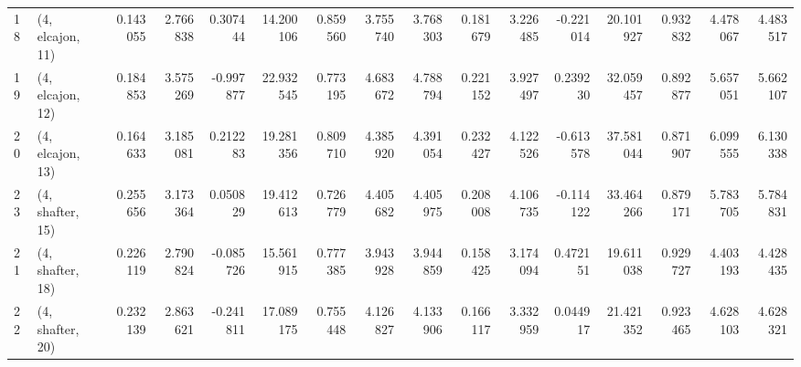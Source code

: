 \begin{tabular}{llrrrrrrrrrrrrrr}
18 &  (4, elcajon, 11) &   0.143055 &  2.766838 &  0.307444 &  14.200106 &  0.859560 &   3.755740 &  3.768303 &  0.181679 &   3.226485 & -0.221014 &   20.101927 &  0.932832 &   4.478067 &   4.483517 \\
19 &  (4, elcajon, 12) &   0.184853 &  3.575269 & -0.997877 &  22.932545 &  0.773195 &   4.683672 &  4.788794 &  0.221152 &   3.927497 &  0.239230 &   32.059457 &  0.892877 &   5.657051 &   5.662107 \\
20 &  (4, elcajon, 13) &   0.164633 &  3.185081 &  0.212283 &  19.281356 &  0.809710 &   4.385920 &  4.391054 &  0.232427 &   4.122526 & -0.613578 &   37.581044 &  0.871907 &   6.099555 &   6.130338 \\
23 &  (4, shafter, 15) &   0.255656 &  3.173364 &  0.050829 &  19.412613 &  0.726779 &   4.405682 &  4.405975 &  0.208008 &   4.106735 & -0.114122 &   33.464266 &  0.879171 &   5.783705 &   5.784831 \\
21 &  (4, shafter, 18) &   0.226119 &  2.790824 & -0.085726 &  15.561915 &  0.777385 &   3.943928 &  3.944859 &  0.158425 &   3.174094 &  0.472151 &   19.611038 &  0.929727 &   4.403193 &   4.428435 \\
22 &  (4, shafter, 20) &   0.232139 &  2.863621 & -0.241811 &  17.089175 &  0.755448 &   4.126827 &  4.133906 &  0.166117 &   3.332959 &  0.044917 &   21.421352 &  0.923465 &   4.628103 &   4.628321 \\
\bottomrule
\end{tabular}
